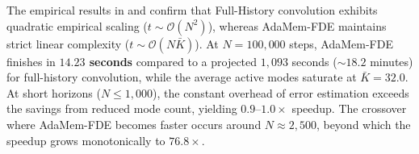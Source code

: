 \documentclass[11pt,a4paper]{article}
\theoremstyle{plain}
\theoremstyle{definition}
\begin{document}
\begin{table}[t]
\centering
\small
\caption{Phase VI Long-Horizon Complexity Scaling on Chaotic Fractional Lorenz Attractor ($\beta = 0.95$).}
\label{tab:phase6_results}
\end{table}

The empirical results in  and  confirm that Full-History convolution exhibits quadratic empirical scaling ($t \sim \mathcal{O}(N^{2})$), whereas AdaMem-FDE maintains strict linear complexity ($t \sim \mathcal{O}(N \bar{K})$). At $N = 100,000$ steps, AdaMem-FDE finishes in \textbf{$14.23$ seconds} compared to a projected $1{,}093$ seconds ($\sim 18.2$ minutes) for full-history convolution, while the average active modes saturate at $\bar{K} = 32.0$. At short horizons ($N \le 1{,}000$), the constant overhead of error estimation exceeds the savings from reduced mode count, yielding $0.9\text{--}1.0\times$ speedup. The crossover where AdaMem-FDE becomes faster occurs around $N \approx 2{,}500$, beyond which the speedup grows monotonically to $76.8\times$.
\end{document}
